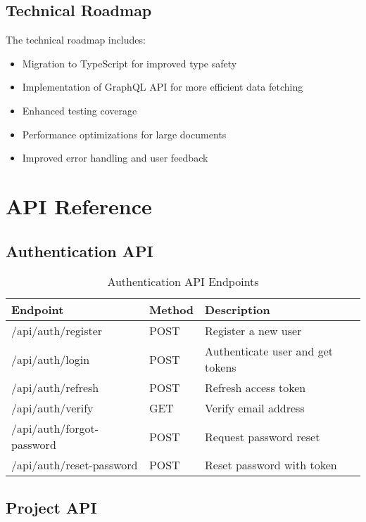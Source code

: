 \documentclass[12pt,a4paper]{book}
\begin{document}
\section{Technical Roadmap}

The technical roadmap includes:

\begin{itemize}
  \item Migration to TypeScript for improved type safety
  \item Implementation of GraphQL API for more efficient data fetching
  \item Enhanced testing coverage
  \item Performance optimizations for large documents
  \item Improved error handling and user feedback
\end{itemize}

\appendix

\chapter{API Reference}

\section{Authentication API}

\begin{table}[h]
\centering
\begin{tabularx}{\textwidth}{|l|X|X|}
\hline
\textbf{Endpoint} & \textbf{Method} & \textbf{Description} \\
\hline
/api/auth/register & POST & Register a new user \\
\hline
/api/auth/login & POST & Authenticate user and get tokens \\
\hline
/api/auth/refresh & POST & Refresh access token \\
\hline
/api/auth/verify & GET & Verify email address \\
\hline
/api/auth/forgot-password & POST & Request password reset \\
\hline
/api/auth/reset-password & POST & Reset password with token \\
\hline
\end{tabularx}
\caption{Authentication API Endpoints}
\end{table}

\section{Project API}
\end{document}
